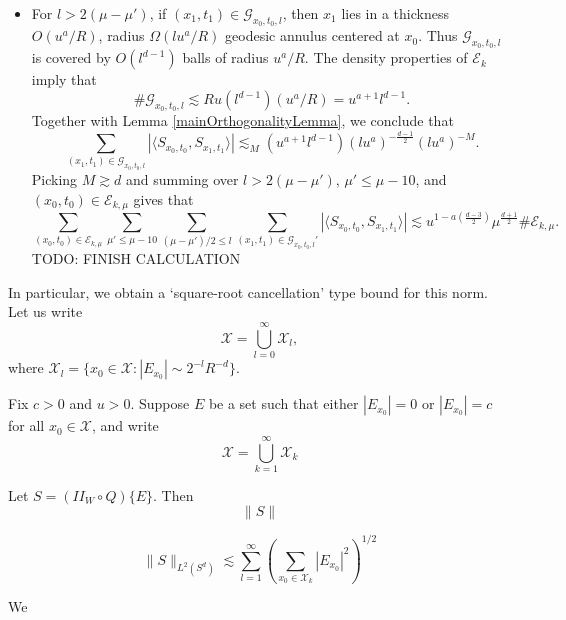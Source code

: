 \begin{itemize}
    \item For $l > 2(\mu - \mu')$, if $(x_1,t_1) \in \mathcal{G}_{x_0,t_0,l}$, then $x_1$ lies in a thickness $O(u^a/R)$, radius $\Omega( l u^a / R )$ geodesic annulus centered at $x_0$. Thus $\mathcal{G}_{x_0,t_0,l}$ is covered by $O(l^{d-1})$ balls of radius $u^a / R$. The density properties of $\mathcal{E}_k$ imply that
    \[ \# \mathcal{G}_{x_0,t_0,l} \lesssim Ru ( l^{d-1} ) (u^a/R) = u^{a+1} l^{d-1}. \]
    Together with Lemma \ref{mainOrthogonalityLemma}, we conclude that
    \[ \sum_{(x_1,t_1) \in \mathcal{G}_{x_0,t_0,l}} |\langle {S\!}_{x_0,t_0}, {S\!}_{x_1,t_1} \rangle| \lesssim_M (u^{a+1} l^{d-1}) (l u^a)^{-\frac{d-1}{2}} (l u^a)^{-M}. \]
    Picking $M \gtrsim d$ and summing over $l > 2 (\mu - \mu')$, $\mu' \leq \mu - 10$, and $(x_0,t_0) \in \mathcal{E}_{k,\mu}$ gives that
    \[ \sum_{(x_0,t_0) \in \mathcal{E}_{k,\mu}} \sum_{\mu' \leq \mu - 10} \sum_{(\mu - \mu')/2 \leq l} \sum_{(x_1,t_1) \in \mathcal{G}_{x_0,t_0,l}'} |\langle {S\!}_{x_0,t_0}, {S\!}_{x_1,t_1} \rangle| \lesssim u^{1 - a \left( \frac{d-3}{2} \right)} \mu^{\frac{d+1}{2}} \# \mathcal{E}_{k,\mu}. \]
    TODO: FINISH CALCULATION
\end{itemize}


In particular, we obtain a `square-root cancellation' type bound for this norm. Let us write
%
\[ \mathcal{X} = \bigcup_{l = 0}^\infty \mathcal{X}_l, \]
%
where $\mathcal{X}_l = \{ x_0 \in \mathcal{X}: |E_{x_0}| \sim 2^{-l} R^{-d} \}$.

\begin{lemma}
    Fix $c > 0$ and $u > 0$. Suppose $E$ be a set such that either $|E_{x_0}| = 0$ or $|E_{x_0}| = c$ for all $x_0 \in \mathcal{X}$, and write
    \[ \mathcal{X} = \bigcup_{k = 1}^\infty \mathcal{X}_k \]


    Let $S = (II_W \circ Q) \{ E \}$. Then
    \[ \| S \| \]

    \[ \| S \|_{L^2(S^d)} \lesssim \sum_{l = 1}^\infty \left( \sum_{x_0 \in \mathcal{X}_k} |E_{x_0}|^2 \right)^{1/2} \]
\end{lemma}

We



